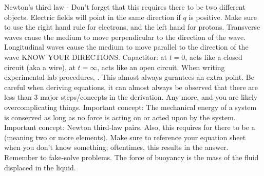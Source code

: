 \markdownRendererInterblockSeparator
{}\markdownRendererUlBeginTight
\markdownRendererUlItem Newton's third law - Don't forget that this requires there to be two different objects.\markdownRendererUlItemEnd 
\markdownRendererUlItem Electric fields will point in the same direction if $q$ is positive.\markdownRendererUlItemEnd 
\markdownRendererUlItem Make sure to use the right hand rule for electrons, and the left hand for protons.\markdownRendererUlItemEnd 
\markdownRendererUlItem Transverse waves cause the medium to move perpendicular to the direction of the wave.\markdownRendererUlItemEnd 
\markdownRendererUlItem Longitudinal waves cause the medium to move parallel to the direction of the wave\markdownRendererUlItemEnd 
\markdownRendererUlItem KNOW YOUR DIRECTIONS.\markdownRendererUlItemEnd 
\markdownRendererUlItem Capactitor: at $t=0$, acts like a closed circuit (aka a wire), at $t=\infty$, acts like an open circuit.\markdownRendererUlItemEnd 
\markdownRendererUlEndTight \markdownRendererInterblockSeparator
{}\markdownRendererInterblockSeparator
{}\markdownRendererUlBeginTight
\markdownRendererUlItem When writing experimental lab procedures, . This almost always gurantees an extra point.\markdownRendererUlItemEnd 
\markdownRendererUlItem Be careful when deriving equations, it can almost always be observed that there are less than 3 major steps/concepts in the derivation. Any more, and you are likely overcomplicating things.\markdownRendererUlItemEnd 
\markdownRendererUlItem Important concept: The mechanical energy of a system is conserved as long as no force is acting on or acted upon by the system.\markdownRendererUlItemEnd 
\markdownRendererUlItem Important concept: Newton third-law pairs. Also, this requires for there to be a  (meaning two or more elements).\markdownRendererUlItemEnd 
\markdownRendererUlItem Make sure to reference your equation sheet when you don't know something; oftentimes, this results in the answer.\markdownRendererUlItemEnd 
\markdownRendererUlItem Remember to fake-solve problems.\markdownRendererUlItemEnd 
\markdownRendererUlEndTight \markdownRendererInterblockSeparator
{}\markdownRendererInterblockSeparator
{}\markdownRendererUlBeginTight
\markdownRendererUlItem The force of buoyancy is the mass of the fluid displaced in the liquid.\markdownRendererUlItemEnd 
\markdownRendererUlEndTight \markdownRendererInterblockSeparator
